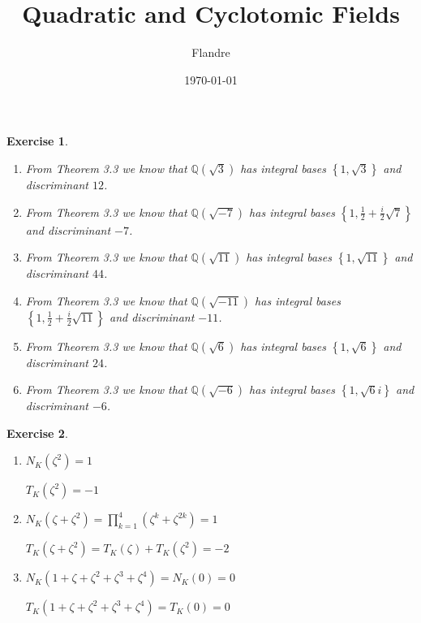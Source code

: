 \documentclass{article}
\title{Quadratic and Cyclotomic Fields}
\author{Flandre}
\date{\today}
\theoremstyle{breakstyle}
\newtheorem{exercise}{Exercise}[section]
\begin{document}
\maketitle

\setcounter{section}{3}

\begin{exercise}
    \leavevmode \vspace{-\baselineskip}
    \begin{enumerate}[label=\alph*)]
        \item From \emph{Theorem 3.3} we know that $\mathbb{Q} \left( \sqrt{3} \right)$ has integral bases $\left\{ 1, \sqrt{3} \right\}$ and discriminant $12$.
        
        \item From \emph{Theorem 3.3} we know that $\mathbb{Q} \left( \sqrt{- 7} \right)$ has integral bases $\left\{ 1, \frac{1}{2} + \frac{i}{2} \sqrt{7} \right\}$ and discriminant $- 7$.
        
        \item From \emph{Theorem 3.3} we know that $\mathbb{Q} \left( \sqrt{11} \right)$ has integral bases $\left\{ 1, \sqrt{11} \right\}$ and discriminant $44$.
        
        \item From \emph{Theorem 3.3} we know that $\mathbb{Q} \left( \sqrt{- 11} \right)$ has integral bases $\left\{ 1, \frac{1}{2} + \frac{i}{2} \sqrt{11} \right\}$ and discriminant $- 11$.
        
        \item From \emph{Theorem 3.3} we know that $\mathbb{Q} \left( \sqrt{6} \right)$ has integral bases $\left\{ 1, \sqrt{6} \right\}$ and discriminant $24$.
        
        \item From \emph{Theorem 3.3} we know that $\mathbb{Q} \left( \sqrt{- 6} \right)$ has integral bases $\left\{ 1, \sqrt{6} i \right\}$ and discriminant $- 6$.
    \end{enumerate}
\end{exercise}

\begin{exercise}
    \leavevmode \vspace{-\baselineskip}
    \begin{enumerate}[label=\alph*)]
        \item $N_K (\zeta^2) = 1$
        
        $T_K (\zeta^2) = - 1$
        
        \item $N_K (\zeta + \zeta^2) = \prod_{k = 1}^4 (\zeta^k + \zeta^{2 k}) = 1$
        
        $T_K (\zeta + \zeta^2) = T_K (\zeta) + T_K (\zeta^2) = - 2$
        
        \item $N_K (1 + \zeta + \zeta^2 + \zeta^3 + \zeta^4) = N_K (0) = 0$
        
        $T_K (1 + \zeta + \zeta^2 + \zeta^3 + \zeta^4) = T_K (0) = 0$
    \end{enumerate}
\end{exercise}
\end{document}

